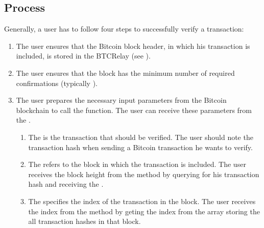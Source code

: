 \documentclass[letterpaper,10pt,english]{sphinxmanual}
\begin{document}
\subsection{Process}
\label{\detokenize{functions:process}}
Generally, a user has to follow four steps to successfully verify a transaction:
\begin{enumerate}
%
\item {} 
The user ensures that the Bitcoin block header, in which his transaction is included, is stored in the BTCRelay (see {\hyperref[\detokenize{functions:storeblockheader}]{}}).

\item {} 
The user ensures that the block has the minimum number of required confirmations (typically ).

\item {} 
The user prepares the necessary input parameters from the Bitcoin blockchain to call the  function. The user can receive these parameters from the .
\begin{enumerate}
%
\item {} 
The  is the transaction that should be verified. The user should note the transaction hash when sending a Bitcoin transaction he wants to verify.

\item {} 
The  refers to the block in which the transaction is included. The user receives the block height from the   method by querying for his transaction hash and receiving the .

\item {} 
The  specifies the index of the transaction in the block. The user receives the index from the  method  by geting the index from the  array storing the all transaction hashes in that block.


\end{enumerate}
\end{enumerate}
\end{document}
